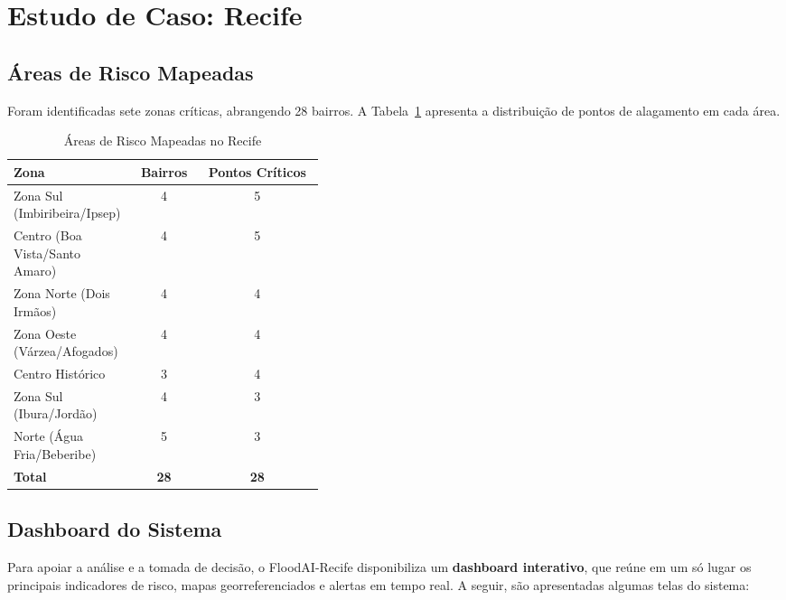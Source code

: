 \section{Estudo de Caso: Recife}

\subsection{Áreas de Risco Mapeadas}

Foram identificadas sete zonas críticas, abrangendo 28 bairros. A Tabela~\ref{tab:areas-mapeadas} apresenta a distribuição de pontos de alagamento em cada área.

\begin{table}[H]
  \centering
  \caption{Áreas de Risco Mapeadas no Recife}
  \label{tab:areas-mapeadas}
  \begin{tabular}{p{0.4\linewidth}  c  c}
    \toprule
    \textbf{Zona}                       & \textbf{Bairros} & \textbf{Pontos Críticos} \\
    \midrule
    Zona Sul (Imbiribeira/Ipsep)        & 4                & 5                        \\
    Centro (Boa Vista/Santo Amaro)      & 4                & 5                        \\
    Zona Norte (Dois Irmãos)            & 4                & 4                        \\
    Zona Oeste (Várzea/Afogados)        & 4                & 4                        \\
    Centro Histórico                    & 3                & 4                        \\
    Zona Sul (Ibura/Jordão)             & 4                & 3                        \\
    Norte (Água Fria/Beberibe)          & 5                & 3                        \\
    \midrule
    \textbf{Total}                      & \textbf{28}      & \textbf{28}             \\
    \bottomrule
  \end{tabular}
\end{table}

\subsection{Dashboard do Sistema}

Para apoiar a análise e a tomada de decisão, o FloodAI-Recife disponibiliza um \textbf{dashboard interativo}, que reúne em um só lugar os principais indicadores de risco, mapas georreferenciados e alertas em tempo real. A seguir, são apresentadas algumas telas do sistema:

